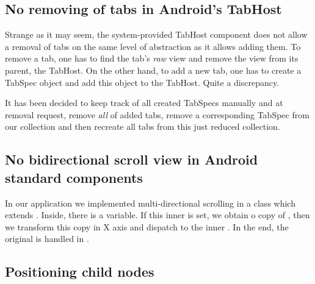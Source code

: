 \subsection{No removing of tabs in Android's TabHost}
\label{subsec:problem-tabhost}

Strange as it may seem, the system-provided TabHost component does not allow a removal of tabs on the same level of abstraction as it allows adding them. To remove a tab, one has to find the tab's \emph{raw} view and remove the view from its parent, the TabHost. On the other hand, to add a new tab, one has to create a TabSpec object and add this object to the TabHost. Quite a discrepancy.

It has been decided to keep track of all created TabSpecs manually and at removal request, remove \emph{all} of added tabs, remove a corresponding TabSpec from our collection and then recreate all tabs from this just reduced collection.

\subsection{No bidirectional scroll view in Android standard components}
\label{subsec:problem-scrollview}
In our application we implemented multi-directional scrolling in a class  which extends . Inside, there is a  variable. If this inner  is set, we obtain o copy of , then we transform this copy in X axis and dispatch to the inner . In the end, the original  is handled in .

\subsection{Positioning child nodes}
\label{subsec:problem-positioning}
